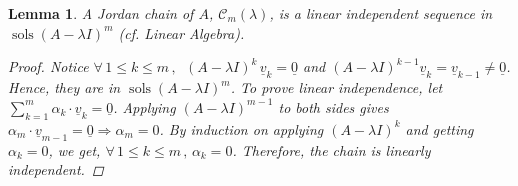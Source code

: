 \documentclass[12pt]{article}
\let\RA\Rightarrow
\newcommand{\Forall}[1]{\forall\,{#1}\,,\,}
\newcommand{\tuple}[1]{\underline{#1}}
\newtheorem{lemma}[theorem]{Lemma}
\begin{document}
\begin{lemma}
  A Jordan chain of $A$, $\mathcal{C}_m(\lambda)$, is a linear independent sequence in $\operatorname{sols}(A-\lambda I)^m$ (cf. Linear Algebra).
  \begin{proof}
    Notice $\Forall{1\leq k\leq m}$ $(A-\lambda I)^k\,\tuple{v}_k=\tuple{0}$ and $(A-\lambda I)^{k-1}\tuple{v}_k=\tuple{v}_{k-1}\neq\tuple{0}$. Hence, they are in $\operatorname{sols}(A-\lambda I)^m$. To prove linear independence, let $\sum_{k=1}^m \alpha_k\cdot\tuple{v}_k=\tuple{0}$. Applying $(A-\lambda I)^{m-1}$ to both sides gives $\alpha_m\cdot\tuple{v}_{m-1}=\tuple{0}\RA \alpha_m=0$. By induction on applying $(A-\lambda I)^k$ and getting $\alpha_k=0$, we get, $\Forall{1\leq k\leq m}\alpha_k=0$. Therefore, the chain is linearly independent.
  \end{proof}
\end{lemma}

\end{document}
